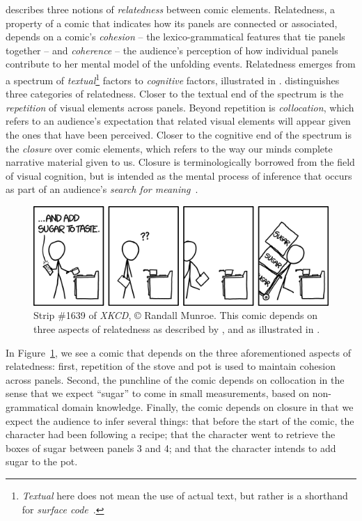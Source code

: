 %
\citeauthor{saraceni2016relatedness} describes three notions of
\emph{relatedness} between comic elements.
Relatedness, a property of a comic that indicates how its panels are
connected or associated, depends on a comic's \emph{cohesion} -- the
lexico-grammatical features that tie panels together -- and \emph{coherence} --
the audience's perception of how individual panels contribute to her mental model
of the unfolding events. Relatedness emerges from a spectrum of \emph{textual}\footnote{\emph{Textual} here does not mean the use of actual text, but rather is a shorthand for \emph{surface code}~\cite{zwaan1998situation}.}
factors to \emph{cognitive} factors, illustrated in .
%
\citeauthor{saraceni2016relatedness} distinguishes three categories of relatedness.
Closer to the textual end of the spectrum is the \emph{repetition} of visual
elements across panels. Beyond repetition is \emph{collocation}, which refers
to an audience's expectation that related visual elements will appear given the
ones that have been perceived. Closer to the cognitive end of the spectrum is
the \emph{closure} over comic elements, which refers to the way our minds 
complete narrative material given to us. Closure is terminologically borrowed 
from the field of visual cognition, but is intended as the mental process 
of inference that occurs as part of an audience's 
\emph{search for meaning}~\cite{gerrig1994readers}.

%
\begin{figure}[t]
	\includegraphics[width=\columnwidth]{xkcd-to_taste.png}
	\caption{
		Strip \#1639 of {\em XKCD}, {\small\copyright} Randall Munroe. This comic
		depends on three aspects of relatedness as described by 
		, and as illustrated in 
		.
	}
\label{fig:xkcd}
\end{figure}
In Figure~\ref{fig:xkcd}, we see a comic that depends on the three aforementioned 
aspects of relatedness: first, repetition of the stove and pot is used to maintain
cohesion across panels. Second, the punchline of the comic depends on
collocation in the sense that we expect ``sugar'' to come in small
measurements, based on non-grammatical domain knowledge.  Finally, the
comic depends on closure in that we expect the audience to infer several
things: that before the start of the comic, the character had been
following a recipe; that the character went to retrieve the boxes of sugar
between panels 3 and 4; and that the character intends to add sugar to the
pot.

